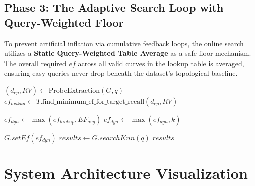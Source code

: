 \documentclass{article}
\begin{document}
\vspace{1em}

\subsection{Phase 3: The Adaptive Search Loop with Query-Weighted Floor}
To prevent artificial inflation via cumulative feedback loops, the online search utilizes a \textbf{Static Query-Weighted Table Average} as a safe floor mechanism. The overall required $ef$ across all valid curves in the lookup table is averaged, ensuring easy queries never drop beneath the dataset's topological baseline.

\begin{algorithm}[H]
\DontPrintSemicolon
\SetAlgoLined
{}

$(d_{ep}, RV) \leftarrow \text{ProbeExtraction}(G, q)$\;
$ef_{lookup} \leftarrow T\text{.find\_minimum\_ef\_for\_target\_recall}(d_{ep}, RV)$\;

$ef_{dyn} \leftarrow \max(ef_{lookup}, EF_{avg})$\;
$ef_{dyn} \leftarrow \max(ef_{dyn}, k)$\;

$G.setEf(ef_{dyn})$\;
$results \leftarrow G.searchKnn(q)$\;
\Return $results$
\caption{Online Adaptive EF Search Loop}
\end{algorithm}

\section{System Architecture Visualization}
\end{document}

